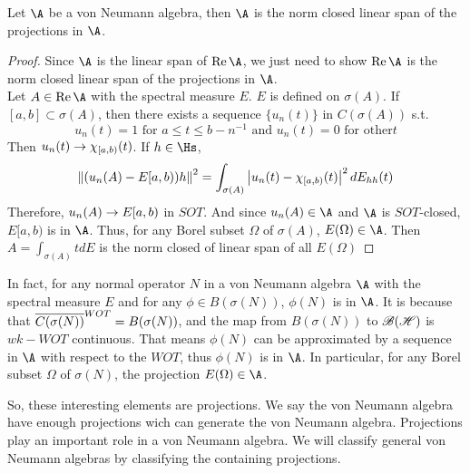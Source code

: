 \begin{thm}
	Let $\A$ be a von Neumann algebra, then $\A$ is the norm closed linear span of the projections in $\A$.
\end{thm}
\begin{proof}
	Since $\A$ is the linear span of $\Rea{\A}$, we just need to show $\Rea{\A}$ is the norm closed linear span of the projections in $\A$.\\
	Let $A \in \Rea{\A}$ with the spectral measure $E$. $E$ is defined on $\sigma(A)$. If $[a,b] \subset \sigma(A)$, then there exists a sequence $\{u_n(t)\}$ in $C(\sigma(A))$ s.t.
	\begin{equation*}
		u_n(t) = 1 \text{ for } a \leqslant t \leqslant b-n^{-1} \text{ and } u_n(t) = 0 \text{ for other} t
	\end{equation*}
	Then $u_n(t) \rightarrow \chi_{[a,b)}(t)$. If $h \in \Hs$,
	\begin{equation*}
		\left\lVert(u_n(A)-E[a,b))h\right\lVert^2 = \int_{\sigma(A)} \left\lvert u_n(t)-\chi_{[a,b)}(t)\right\lvert^2 dE_{hh}(t)
	\end{equation*}
	Therefore, $u_n(A) \rightarrow E[a,b)$ in $SOT$. And since $u_n(A) \in \A$ and $\A$ is $SOT$-closed, $E[a,b)$ is in $\A$. Thus, for any Borel subset $\Omega$ of $\sigma(A)$, $E(\Omega) \in \A$. Then $A = \int_{\sigma(A)} t dE$ is the norm closed of linear span of all $E(\Omega)$
\end{proof}
\begin{rem}
	In fact, for any normal operator $N$ in a von Neumann algebra $\A$ with the spectral measure $E$ and for any $\phi \in B(\sigma(N))$, $\phi(N)$ is in $\A$. It is because that $\overline{C(\sigma(N))}^{WOT} = B(\sigma(N))$, and the map from $B(\sigma(N))$ to $\mathscr{B(H)}$ is $wk-WOT$ continuous. That means $\phi(N)$ can be approximated by a sequence in $\A$ with respect to the $WOT$, thus $\phi(N)$ is in $\A$. In particular, for any Borel subset $\Omega$ of $\sigma(N)$, the projection $E(\Omega) \in \A$.
\end{rem}

So, these interesting elements are projections. We say the von Neumann algebra have enough projections wich can generate the von Neumann algebra. Projections play an important role in a von Neumann algebra. We will classify general von Neumann algebras by classifying the containing projections.

